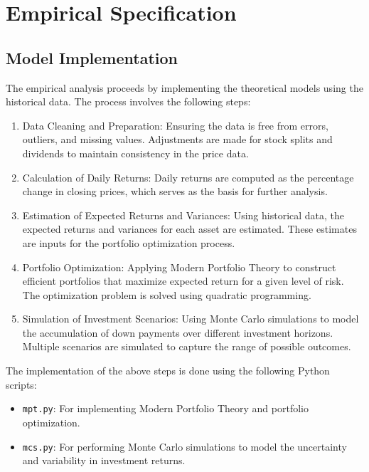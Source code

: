 \section{Empirical Specification}

\subsection{Model Implementation}
The empirical analysis proceeds by implementing the theoretical models using the historical data. The process involves the following steps:
\begin{enumerate}
    \item Data Cleaning and Preparation: Ensuring the data is free from errors, outliers, and missing values. Adjustments are made for stock splits and dividends to maintain consistency in the price data.
    \item Calculation of Daily Returns: Daily returns are computed as the percentage change in closing prices, which serves as the basis for further analysis.
    \item Estimation of Expected Returns and Variances: Using historical data, the expected returns and variances for each asset are estimated. These estimates are inputs for the portfolio optimization process.
    \item Portfolio Optimization: Applying Modern Portfolio Theory to construct efficient portfolios that maximize expected return for a given level of risk. The optimization problem is solved using quadratic programming.
    \item Simulation of Investment Scenarios: Using Monte Carlo simulations to model the accumulation of down payments over different investment horizons. Multiple scenarios are simulated to capture the range of possible outcomes.
\end{enumerate}

The implementation of the above steps is done using the following Python scripts:
\begin{itemize}
    \item \texttt{mpt.py}: For implementing Modern Portfolio Theory and portfolio optimization.
    \item \texttt{mcs.py}: For performing Monte Carlo simulations to model the uncertainty and variability in investment returns.
\end{itemize}

